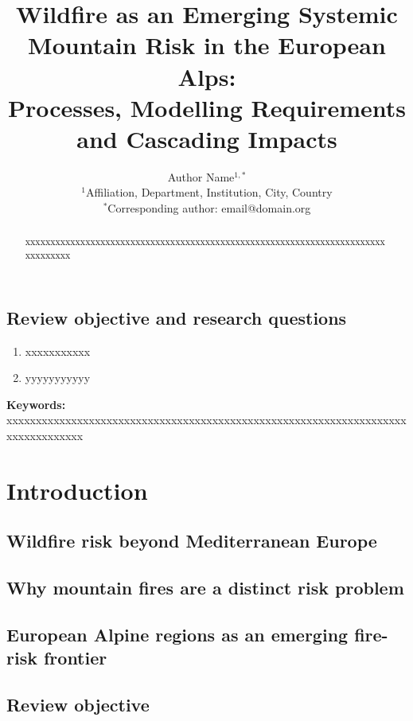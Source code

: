 \documentclass[11pt,a4paper]{article}
\title{
Wildfire as an Emerging Systemic Mountain Risk in the European Alps:\\
Processes, Modelling Requirements and Cascading Impacts
}
\author{
Author Name$^{1,*}$ \\
\small $^{1}$Affiliation, Department, Institution, City, Country \\
\small $^{*}$Corresponding author: email@domain.org
}
\date{}
\begin{document}
\maketitle

\subsection{Review objective and research questions}

\begin{enumerate}
    \item xxxxxxxxxxx
    \item yyyyyyyyyyy

\end{enumerate}

\begin{abstract}
xxxxxxxxxxxxxxxxxxxxxxxxxxxxxxxxxxxxxxxxxxxxxxxxxxxxxxxxxxxxxxxxxxxxxxxxxxxxxxxxx 
\end{abstract}

\noindent\textbf{Keywords:}
xxxxxxxxxxxxxxxxxxxxxxxxxxxxxxxxxxxxxxxxxxxxxxxxxxxxxxxxxxxxxxxxxxxxxxxxxxxxxxxxx 

\tableofcontents
\newpage


\section{Introduction}

\subsection{Wildfire risk beyond Mediterranean Europe}

\subsection{Why mountain fires are a distinct risk problem}

\subsection{European Alpine regions as an emerging fire-risk frontier}

\subsection{Review objective}
\end{document}
